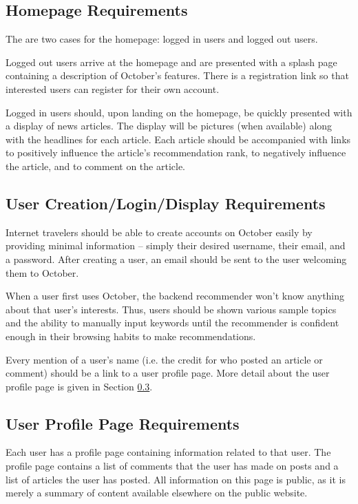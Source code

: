 \documentclass[11pt,letterpaper]{article}
\begin{document}
\subsection{Homepage Requirements}
The are two cases for the homepage: logged in users and logged out users.

Logged out users arrive at the homepage and are presented with a splash page containing a description of October's features.
There is a registration link so that interested users can register for their own account.

Logged in users should, upon landing on the homepage, be quickly presented with a display of news articles.
The display will be pictures (when available) along with the headlines for each article.
Each article should be accompanied with links to positively influence the article's recommendation rank, to negatively influence the article, and to comment on the article.

\subsection{User Creation/Login/Display Requirements}
Internet travelers should be able to create accounts on October easily by providing minimal information -- simply their desired username, their email, and a password.
After creating a user, an email should be sent to the user welcoming them to October.

When a user first uses October, the backend recommender won't know anything about that user's interests.
Thus, users should be shown various sample topics and the ability to manually input keywords until the recommender is confident enough in their browsing habits to make recommendations.

Every mention of a user's name (i.e. the credit for who posted an article or comment) should be a link to a user profile page. More detail about the user profile page is given in Section \ref{sec:profilepage}.

\subsection{User Profile Page Requirements}
\label{sec:profilepage}
Each user has a profile page containing information related to that user.
The profile page contains a list of comments that the user has made on posts and a list of articles the user has posted.
All information on this page is public, as it is merely a summary of content available elsewhere on the public website.
\end{document}
